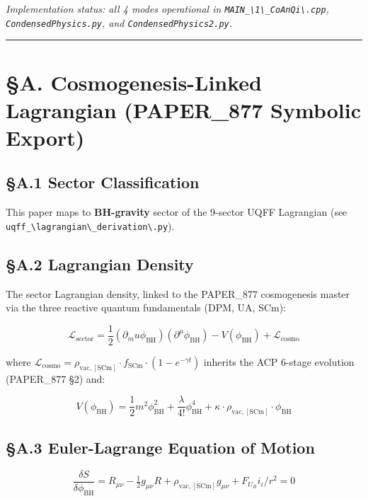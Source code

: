 \documentclass[12pt,a4paper]{article}
\begin{document}
\emph{Implementation status: all 4 modes operational in \texttt{MAIN\_\textbackslash {1\textbackslash \_CoAnQi\textbackslash }.cpp}, \texttt{CondensedPhysics.py}, and \texttt{CondensedPhysics2.py}.}

\medskip\hrule\medskip

\section{\S{}A. Cosmogenesis-Linked Lagrangian (PAPER\_877 Symbolic Export)}

\subsection{\S{}A.1 Sector Classification}

This paper maps to \textbf{BH-gravity} sector of the 9-sector UQFF Lagrangian (see \texttt{uqff\_\textbackslash {lagrangian\textbackslash \_derivation\textbackslash }.py}).

\subsection{\S{}A.2 Lagrangian Density}

The sector Lagrangian density, linked to the PAPER\_877 cosmogenesis master via the three reactive quantum fundamentals (DPM, UA, SCm):

\begin{equation}
\mathcal{L}_{\mathrm{sector}} = \frac{1}{2}(\partial_mu \phi_{\mathrm{BH}})(\partial^\mu \phi_{\mathrm{BH}}) - V(\phi_{\mathrm{BH}}) + \mathcal{L}_{\mathrm{cosmo}}
\end{equation}

where $\mathcal{L}_{\mathrm{cosmo}} = \rho_{\mathrm{vac,[SCm]}} \cdot f_{\mathrm{SCm}} \cdot (1 - e^{-\gamma t})$ inherits the ACP 6-stage evolution (PAPER\_877 \S{}2) and:

\begin{equation}
V(\phi_{\mathrm{BH}}) = \frac{1}{2} m^2 \phi_{\mathrm{BH}}^2 + \frac{\lambda}{4!} \phi_{\mathrm{BH}}^4 + \kappa \cdot \rho_{\mathrm{vac,[SCm]}} \cdot \phi_{\mathrm{BH}}
\end{equation}

\subsection{\S{}A.3 Euler-Lagrange Equation of Motion}

\begin{equation}
\boxed{\frac{\delta S}{\delta \phi_{\mathrm{BH}}} = R_{\mu\nu} - \tfrac{1}{2}g_{\mu\nu}R + \rho_{\mathrm{vac,[SCm]}} g_{\mu\nu} + F_U_Bi_i/r^2 = 0}
\end{equation}
\end{document}
